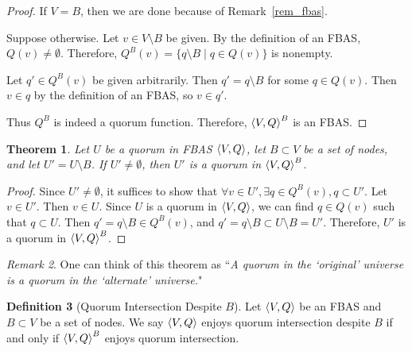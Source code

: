 \documentclass[12pt, psamsfonts]{amsart}
\newtheorem{thm}{Theorem}[subsection]
\theoremstyle{definition}
\newtheorem{defn}[thm]{Definition}
\theoremstyle{remark}
\newtheorem{rem}[thm]{Remark}
\numberwithin{equation}{subsection}
\begin{document}
\begin{proof}
    If $V = B$, then we are done because of Remark~\ref{rem_fbas}.

    Suppose otherwise.
    Let $v \in V \setminus B$ be given.
    By the definition of an FBAS, $Q(v) \ne \emptyset$.
    Therefore, $Q^B(v) = \{ q \setminus B \mid q \in Q(v) \}$ is nonempty.

    Let $q' \in Q^B(v)$ be given arbitrarily.
    Then $q' = q \setminus B$ for some $q \in Q(v)$.
    Then $v \in q$ by the definition of an FBAS, so $v \in q'$.
    
    Thus $Q^B$ is indeed a quorum function.
    Therefore, $\ev{V, Q}^B$ is an FBAS\@.
\end{proof}

\begin{thm}\label{quorum_delete_fbas}
    Let $U$ be a quorum in FBAS $\ev{V, Q}$, let $B \subset V$ be a set of nodes, and let $U' = U \setminus B$.
    If $U' \ne \emptyset$, then $U'$ is a quorum in $\ev{V, Q}^B$.
\end{thm}

\begin{proof}
    Since $U' \ne \emptyset$, it suffices to show that $\forall v \in U', \exists q \in Q^B(v), q \subset U'$.
    Let $v \in U'$.
    Then $v \in U$.
    Since $U$ is a quorum in $\ev{V, Q}$, we can find $q \in Q(v)$ such that $q \subset U$.
    Then $q' = q \setminus B \in Q^B(v)$, and $q' = q \setminus B \subset U \setminus B = U'$.
    Therefore, $U'$ is a quorum in $\ev{V, Q}^B$.
\end{proof}

\begin{rem}
    One can think of this theorem as ``\textit{A quorum in the `original' universe is a quorum in the `alternate' universe.}"
\end{rem}

\begin{defn}[Quorum Intersection Despite $B$]
    Let $\ev{V, Q}$ be an FBAS and $B \subset V$ be a set of nodes.
    We say $\ev{V, Q}$ enjoys quorum intersection despite $B$ if and only if $\ev{V, Q}^B$ enjoys quorum intersection.
\end{defn}
\end{document}
